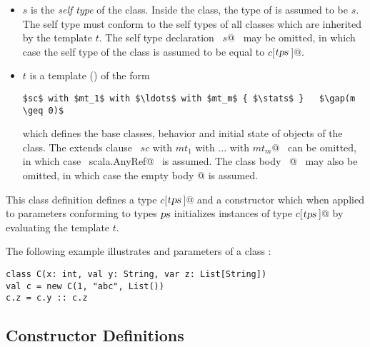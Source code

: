 \begin{itemize}
\item[] 
$s$ is the {\em self type} of the class. Inside the
class, the type of  is assumed to be $s$.  The self
type must conform to the self types of all classes which are inherited
by the template $t$. The self type declaration ~\lstinline@requires $s$@~ may be
omitted, in which case the self type of the class is assumed to be
equal to \lstinline@$c$[$\mbox{\sl tps}\,$]@.
\item[] 
$t$ is a
template () of the form
\begin{lstlisting}
$sc$ with $mt_1$ with $\ldots$ with $mt_m$ { $\stats$ }   $\gap(m \geq 0)$
\end{lstlisting}
which defines the base classes, behavior and initial state of objects of
the class. The extends clause ~\lstinline@extends $sc$ with $mt_1$ with $\ldots$ with $mt_m$@~ 
can be omitted, in which case
~\lstinline@extends scala.AnyRef@~ is assumed.  The class body
~\lstinline@{$\stats\,$}@~ may also be omitted, in which case the empty body
\lstinline@{}@ is assumed.
\end{itemize}
This class definition defines a type \lstinline@$c$[$\mbox{\sl tps}\,$]@ and a constructor
which when applied to parameters conforming to types $\mbox{\sl ps}$
initializes instances of type \lstinline@$c$[$\mbox{\sl tps}\,$]@ by evaluating the template
$t$.

\example The following example illustrates  and 
parameters of a class :
\begin{lstlisting}
class C(x: int, val y: String, var z: List[String])
val c = new C(1, "abc", List())
c.z = c.y :: c.z
\end{lstlisting}


\subsection{Constructor Definitions}\label{sec:constr-defs}

